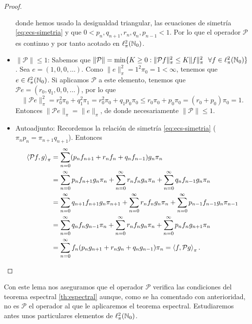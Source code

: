 \begin{proof}
\begin{itemize}
\begin{equation*}
            \end{equation*}
            donde hemos usado la desigualdad triangular, las ecuaciones de simetría \eqref{eq:ecs-simetria} y que $0 <p_n,q_{n+1},r_n,q_n,p_{n-1}<1$. Por lo que el operador $\mathcal P$ es continuo y por tanto acotado en $\ell^2_\pi(\mathbb{N}_0)$.
            \item $\|\mathcal P\|\leq 1$: Sabemos que $\|\mathcal P\|= \min\{K\geq 0: \|\mathcal P f\|_\pi^2\leq K\|f\|^2_\pi \ \ \forall f\in\ell^2_\pi(\mathbb{N}_0) \}$. Sea $e = (1,0,0,\dots)$. Como $\|e\|^2_\pi = 1^2 \pi_0 =1<\infty$, tenemos que $e\in\ell^2_\pi(\mathbb{N}_0)$. Si aplicamos $\mathcal{P}$ a este elemento, tenemos que $\mathcal{P}e = (r_0, q_1, 0, 0,\dots)$, por lo que
            $$
            \|\mathcal{P} e\|^2_\pi= r_0^2\pi_0 + q_1^2\pi_1 = r_0^2\pi_0 +q_1 p_0 \pi_0 \leq r_0\pi_0 + p_0\pi_0 = (r_0+p_0)\pi_0 = 1.
            $$
            Entonces $\|\mathcal{P}e\|_\pi=\|e\|_\pi$, de donde necesariamente $\|\mathcal{P}\|\leq 1$.

            \item Autoadjunto: Recordemos la relación de simetría \eqref{eq:ecs-simetria} ($\pi_n p_n = \pi_{n+1}q_{n+1}$). Entonces
            \begin{equation*}
                \begin{split}
                    \left\langle \mathcal P f , g \right\rangle_\pi&=\sum_{n=0}^\infty(p_n f_{n+1} + r_n f_n + q_n f_{n-1})g_n\pi_n\\
                    &= \sum_{n=0}^\infty p_n f_{n+1}g_n\pi_n + \sum_{n=0}^\infty r_n f_{n}g_n\pi_n + \sum_{n=0}^\infty q_n f_{n-1}g_n\pi_n \\
                    &= \sum_{n=0}^\infty q_{n+1} f_{n+1}g_n\pi_{n+1} + \sum_{n=0}^\infty r_n f_{n}g_n\pi_n + \sum_{n=0}^\infty p_{n-1} f_{n-1}g_n\pi_{n-1} \\
                    &= \sum_{n=0}^\infty q_{n} f_{n}g_{n-1}\pi_{n} + \sum_{n=0}^\infty r_n f_{n}g_n\pi_n + \sum_{n=0}^\infty p_{n} f_{n}g_{n+1}\pi_{n} \\
                    &= \sum_{n=0}^\infty f_n(p_n g_{n+1} + r_n g_n+ q_n g_{n-1})\pi_n = \left\langle f , \mathcal{P}g \right\rangle_\pi.
                \end{split}  
            \end{equation*}

        \end{itemize}

    \end{proof}

    Con este lema nos aseguramos que el operador $\mathcal{P}$ verifica las condiciones del teorema espectral \ref{th:espectral} aunque, como se ha comentado con anterioridad, no es $\mathcal{P}$ el operador al que le aplicaremos el teorema espectral. Estudiaremos antes unos particulares elementos de $\ell^2_\pi(\mathbb{N}_0)$.

